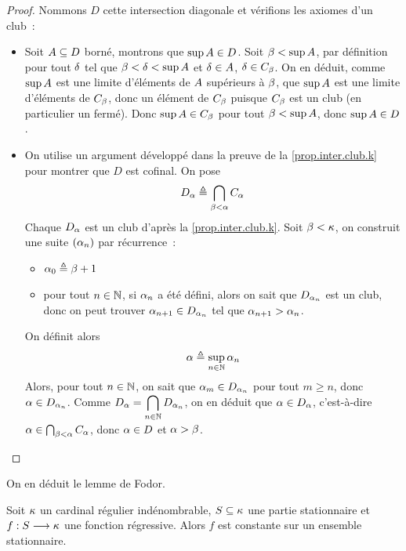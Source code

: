 \begin{proof}
  Nommons $D$ cette intersection diagonale et vérifions les axiomes d'un club~:
  \begin{itemize}
  \item Soit $A\subseteq D$ borné, montrons que $\sup A \in D$. Soit
    $\beta < \sup A$, par définition pour tout $\delta$ tel que
    $\beta<\delta<\sup A$ et $\delta \in A$,
    $\delta \in C_\beta$. On en déduit, comme $\sup A$ est une
    limite d'éléments de $A$ supérieurs à $\beta$, que $\sup A$ est
    une limite d'éléments de $C_\beta$, donc un élément de
    $C_\beta$ puisque $C_\beta$ est un club (en particulier un
    fermé). Donc $\sup A\in C_\beta$ pour tout
    $\beta < \sup A$, donc $\sup A \in D$.
  \item On utilise un argument développé dans la preuve de la
    \cref{prop.inter.club.k} pour montrer que $D$ est cofinal. On pose
    \[D_\alpha \triangleq \bigcap_{\beta < \alpha} C_\alpha\]
    Chaque $D_\alpha$ est un club d'après la \cref{prop.inter.club.k}.
    Soit $\beta < \kappa$, on construit une suite $(\alpha_n)$ par
    récurrence~:
    \begin{itemize}
    \item $\alpha_0 \triangleq \beta + 1$
    \item pour tout $n \in \mathbb N$, si $\alpha_n$ a été défini, alors on
      sait que $D_{\alpha_n}$ est un club, donc on peut trouver
      $\alpha_{n+1}\in D_{\alpha_n}$ tel que $\alpha_{n+1} > \alpha_n$.
    \end{itemize}
    On définit alors
    \[\alpha \triangleq \sup_{n \in \mathbb N} \alpha_n\]
    Alors, pour tout $n \in \mathbb N$, on sait que $\alpha_m \in D_{\alpha_n}$
    pour tout $m \geq n$, donc $\alpha \in D_{\alpha_n}$. Comme
    $\displaystyle D_{\alpha} =\bigcap_{n \in \mathbb N} D_{\alpha_n}$,
    on en déduit que $\alpha \in D_\alpha$, c'est-à-dire
    $\alpha \in \bigcap_{\beta < \alpha} C_\alpha$, donc
    $\alpha \in D$ et $\alpha > \beta$.\qedhere
  \end{itemize}
\end{proof}

\noindent
On en déduit le lemme de Fodor.

\begin{lemma}
  Soit $\kappa$ un cardinal régulier indénombrable, $S \subseteq \kappa$
  une partie stationnaire et $f : \displaystyle S \longrightarrow \kappa$ une fonction
  régressive. Alors $f$ est constante sur un ensemble stationnaire.
\end{lemma}


